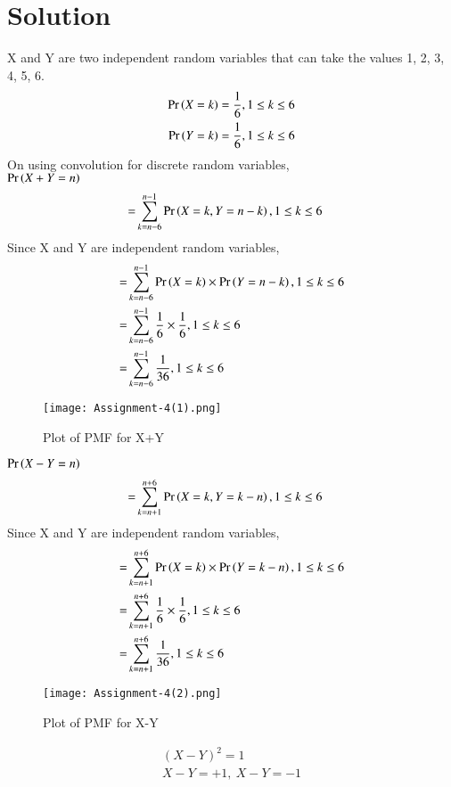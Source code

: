 \documentclass[journal,12pt,twocolumn]{IEEEtran}
\begin{document}
\section*{Solution}
X and Y are two independent random variables that can take the values 1, 2, 3, 4, 5, 6.\\ 
\begin{align}
    \Pr\left(X=k\right)=\frac{1}{6}, 1\leq k \leq 6\\
    \Pr\left(Y=k\right)=\frac{1}{6}, 1\leq k \leq 6
\end{align}
On using convolution for discrete random variables,\\
$\Pr\left(X+Y=n\right)$
\begin{align}
    =&\sum_{k=n-6}^{n-1} \Pr\left(X=k,Y=n-k\right), 1\leq k \leq 6
\end{align}
Since X and Y are independent random variables,
\begin{align}
    =&\sum_{k=n-6}^{n-1} \Pr\left(X=k\right)\times\Pr\left(Y=n-k\right), 1\leq k \leq 6\\
    =&\sum_{k=n-6}^{n-1} \frac{1}{6}\times\frac{1}{6}, 1\leq k \leq 6\\
    =&\sum_{k=n-6}^{n-1} \frac{1}{36}, 1\leq k \leq 6\label{0.0.6}
\end{align}
\begin{figure}[htb]
    \texttt{[image: Assignment-4(1).png]}
    \caption{Plot of PMF for X+Y}
\end{figure}
\newline
$\Pr\left(X-Y=n\right)$
\begin{align}
    =&\sum_{k=n+1}^{n+6} \Pr\left(X=k,Y=k-n\right), 1\leq k \leq 6
\end{align}
Since X and Y are independent random variables,
\begin{align}
    =&\sum_{k=n+1}^{n+6} \Pr\left(X=k\right)\times\Pr\left(Y=k-n\right), 1\leq k \leq 6\\
    =&\sum_{k=n+1}^{n+6} \frac{1}{6}\times\frac{1}{6}, 1\leq k \leq 6\\
    =&\sum_{k=n+1}^{n+6} \frac{1}{36}, 1\leq k \leq 6\label{0.0.10}
\end{align}
\begin{figure}[htb]
    \texttt{[image: Assignment-4(2).png]}
    \caption{Plot of PMF for X-Y}
\end{figure}
\begin{align}
    (X-Y)^2=1\\
    X-Y=+1,\:X-Y=-1
\end{align}
\end{document}

